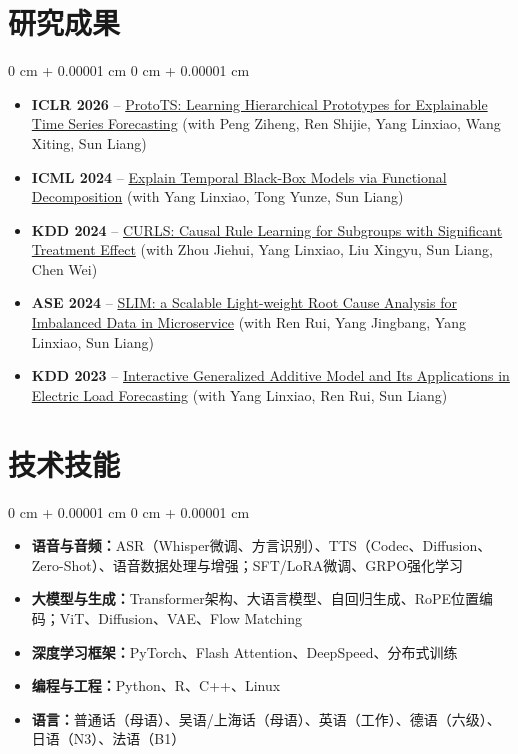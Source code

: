 \documentclass[10pt, letterpaper]{article}
\newenvironment{highlights}{
    \begin{itemize}[
        topsep=0.10 cm,
        parsep=0.10 cm,
        partopsep=0pt,
        itemsep=0pt,
        leftmargin=0 cm + 10pt
    ]
}{
    \end{itemize}
}
\newenvironment{onecolentry}{
    \begin{adjustwidth}{
        0 cm + 0.00001 cm
    }{
        0 cm + 0.00001 cm
    }
}{
    \end{adjustwidth}
}
\begin{document}
    \section{研究成果}
    \begin{onecolentry}
        \begin{highlights}
            \item \textbf{ICLR 2026} -- \href{https://openreview.net/forum?id=IbcdVwzLrp}{ProtoTS: Learning Hierarchical Prototypes for Explainable Time Series Forecasting} (with Peng Ziheng, Ren Shijie, Yang Linxiao, Wang Xiting, Sun Liang)
            \item \textbf{ICML 2024} -- \href{https://icml.cc/virtual/2024/poster/33933}{Explain Temporal Black-Box Models via Functional Decomposition} (with Yang Linxiao, Tong Yunze, Sun Liang)
            \item \textbf{KDD 2024} -- \href{https://arxiv.org/abs/2407.01004}{CURLS: Causal Rule Learning for Subgroups with Significant Treatment Effect} (with Zhou Jiehui, Yang Linxiao, Liu Xingyu, Sun Liang, Chen Wei)
            \item \textbf{ASE 2024} -- \href{https://arxiv.org/abs/2405.20848}{SLIM: a Scalable Light-weight Root Cause Analysis for Imbalanced Data in Microservice} (with Ren Rui, Yang Jingbang, Yang Linxiao, Sun Liang)
            \item \textbf{KDD 2023} -- \href{https://doi.org/10.1145/3580305.3599848}{Interactive Generalized Additive Model and Its Applications in Electric Load Forecasting} (with Yang Linxiao, Ren Rui, Sun Liang)
        \end{highlights}
    \end{onecolentry}

    \section{技术技能}
    \begin{onecolentry}
        \begin{highlights}
            \item \textbf{语音与音频：}ASR（Whisper微调、方言识别）、TTS（Codec、Diffusion、Zero-Shot）、语音数据处理与增强；SFT/LoRA微调、GRPO强化学习
            \item \textbf{大模型与生成：}Transformer架构、大语言模型、自回归生成、RoPE位置编码；ViT、Diffusion、VAE、Flow Matching
            \item \textbf{深度学习框架：}PyTorch、Flash Attention、DeepSpeed、分布式训练
            \item \textbf{编程与工程：}Python、R、C++、Linux
            \item \textbf{语言：}普通话（母语）、吴语/上海话（母语）、英语（工作）、德语（六级）、日语（N3）、法语（B1）
        \end{highlights}
    \end{onecolentry}
\end{document}
